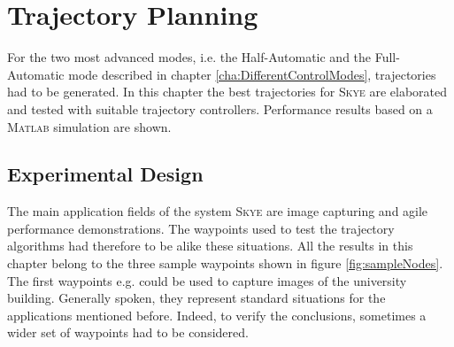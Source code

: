 \graphicspath{{graphics/}{graphics/controller/}}

\chapter{Trajectory Planning}
\label{cha:trajectory}
For the two most advanced modes, i.e. the Half-Automatic and the Full-Automatic mode described in chapter \ref{cha:DifferentControlModes}, trajectories had to be generated. In this chapter the best trajectories for \textsc{Skye} are elaborated and tested with suitable trajectory controllers. Performance results based on a \textsc{Matlab} simulation are shown.


\section{Experimental Design}
\label{sec:experimental design}
The main application fields of the system \textsc{Skye} are image capturing and agile performance demonstrations. The waypoints used to test the trajectory algorithms had therefore to be alike these situations. All the results in this chapter belong to the three sample waypoints shown in figure \ref{fig:sampleNodes}. The first waypoints e.g. could be used to capture images of the university building. Generally spoken, they represent standard situations for the applications mentioned before. Indeed, to verify the conclusions, sometimes a wider set of waypoints had to be considered. 

